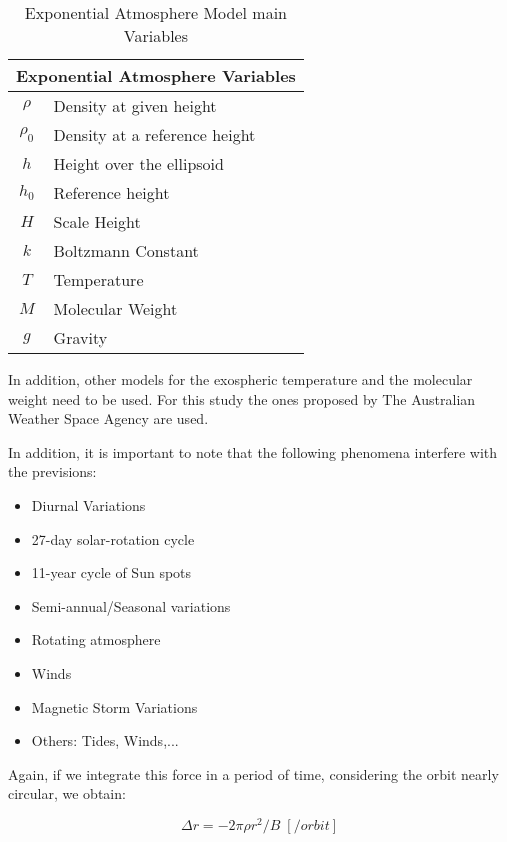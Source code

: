 \begin{table}[H]
\centering
\begin{tabular}{|c|l|}
\hline
\multicolumn{2}{|c|}{Exponential Atmosphere Variables}     \\ \hline
$\rho$             & Density at given height                  \\ \hline
$\rho_{0}$         & Density at a reference height		       \\ \hline
$h$           & Height over the ellipsoid            \\ \hline
$h_{0}$            & Reference height \\ \hline
$H$              & Scale Height      \\ \hline
$k$              & Boltzmann Constant      \\ \hline
$T$              & Temperature      \\ \hline
$M$              & Molecular Weight      \\ \hline
$g$              & Gravity      \\ \hline

\end{tabular}
\caption{Exponential Atmosphere Model main Variables}
\end{table}  

In addition, other models for the exospheric temperature and the molecular weight need to be used. For this study the ones proposed by The Australian Weather Space Agency are used.

In addition, it is important to note that the following phenomena interfere with the previsions:

\begin{itemize}
\item Diurnal Variations
\item 27-day solar-rotation cycle
\item 11-year cycle of Sun spots
\item Semi-annual/Seasonal variations
\item Rotating atmosphere
\item Winds
\item Magnetic Storm Variations
\item Others: Tides, Winds,...
\end{itemize}

Again, if we integrate this force in a period of time, considering the orbit nearly circular, we obtain:

\begin{equation}
\Delta r = -2 \pi \rho r^2/B \; [/orbit]
\end{equation}

